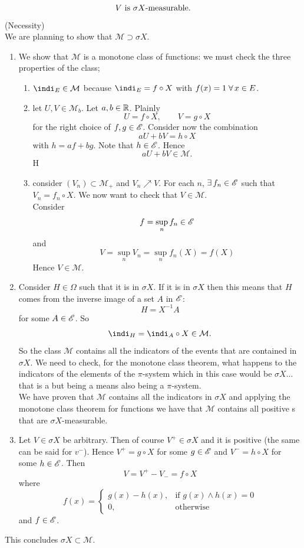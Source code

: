 \documentclass{report}
\begin{document}
\begin{fancyproof}
	\[V\text{ is }\sigma X\text{-measurable.}\vspace{1cm}\]
	(Necessity)\\
	We are planning to show that $\mathcal{M}\supset \sigma X$. 
	\begin{enumerate}
		\item We show that $\mathcal{M}$ is a monotone class of functions: we must check the three properties of the class;
		\begin{enumerate}
			\item $\indi_E\in\mathcal{M}$ because $\indi_E=f\circ X$ with $f(x)=1\;\forall\, x\in E$.
			\item let $U,V\in\mathcal{M}_b$. Let $a,b\in\mathbb{R}$. Plainly
			\[U=f\circ X,\qquad V=g\circ X\]
			for the right choice of $f,g\in\mathscr{E}$. Consider now the combination
			\[aU+bV=h\circ X\]
			with $h=af+bg$. Note that $h\in\mathscr{E}$. Hence
			\[aU+bV\in\mathcal{M}.\] H
			\item consider $(V_n)\subset\mathcal{M}_+$ and $V_n\nearrow V$. For each $n$, $\exists\,f_n\in\mathscr{E}$ such that $V_n=f_n\circ X$. We now want to check that $V\in\mathcal{M}$.\\
			Consider 
			\[f=\sup_{n} f_n\in\mathscr{E}\]
			and
			\[V=\sup_{n}V_n=\sup_{n} f_{n}(X)=f(X)\]
			Hence $V\in\mathcal{M}$.
		\end{enumerate}
		\item Consider $H\in\Omega$ such that it is in $\sigma X$. If it is in $\sigma X$ then this means that $H$ comes from the inverse image of a set $A$ in $\mathscr{E}$:
		\[H=X^{-1}A\]
		for some $A\in\mathscr{E}$. So
		\[\indi_H=\indi_A\circ X\in\mathcal{M}.\]
		So the class $\mathcal{M}$ contains all the indicators of the events that are contained in $\sigma X$. We need to check, for the monotone class theorem, what happens to the indicators of the elements of the $\pi$-system which in this case would be $\sigma X$... that is a \sa{} but being a \sa{} means also being a $\pi$-system.\\
		We have proven that $\mathcal{M}$ contains all the indicators in $\sigma X$ and applying the monotone class theorem for functions we have that 
		$\mathcal{M}$ contains all positive \rv s that are $\sigma X$-measurable.
		\item Let $V\in\sigma X$ be arbitrary. Then of course $V^{+}\in\sigma X$ and it is positive (the same can be said for $v^{-}$). Hence $V^{+}=g\circ X$ for some $g\in\mathscr{E}$ and $V^{-}=h\circ X$ for some $h\in\mathscr{E}$. Then 
		\[V=V^{+}-V_{-}=f\circ X\]
		where
		\[f(x)=\begin{cases}
			g(x)-h(x), &\text{if }g(x)\wedge h(x)=0\\
			0, &\text{otherwise}
		\end{cases}\]
		and $f\in\mathscr{E}$.
 	\end{enumerate}
 	This concludes $\sigma X\subset\mathcal{M}$.
\end{fancyproof}
\end{document}
